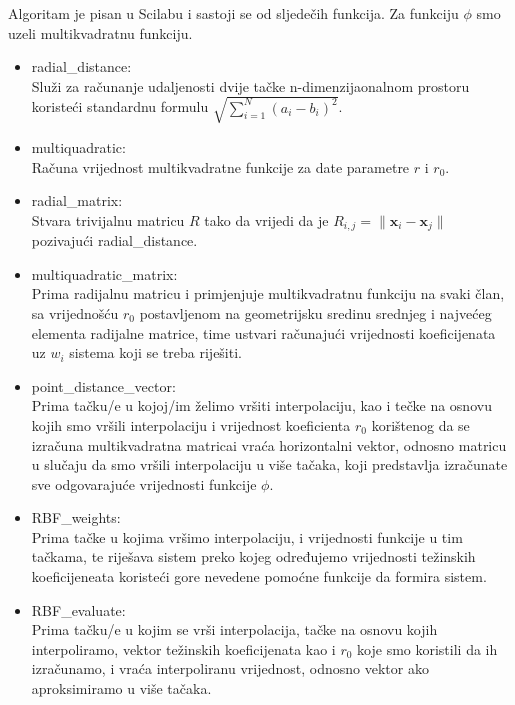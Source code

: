 \documentclass[12pt, a4paper]{report}
\theoremstyle{definition}
\begin{document}
	Algoritam je pisan u Scilabu i sastoji se od sljedečih funkcija. Za funkciju $\phi$ smo uzeli multikvadratnu funkciju.
	\begin{itemize}
		\item radial\_distance:\\
		Služi za računanje udaljenosti dvije tačke n-dimenzijaonalnom prostoru koristeći standardnu formulu $\sqrt{\sum_{i=1}^N(a_i-b_i)^2}$.
		
		\item multiquadratic:\\
		Računa vrijednost multikvadratne funkcije za date parametre $r$ i $r_0$.
		
		\item radial\_matrix:\\
		Stvara trivijalnu matricu $R$ tako da vrijedi da je 
		$R_{i,j}= \| \textbf{x}_i - \textbf{x}_j \|$ pozivajući radial\_distance.
		
		\item multiquadratic\_matrix:\\
		Prima radijalnu matricu i primjenjuje multikvadratnu funkciju na svaki član, sa vrijednošću $r_0$ postavljenom na geometrijsku sredinu srednjeg i najvećeg elementa radijalne matrice, time ustvari računajući vrijednosti koeficijenata uz $w_i$ sistema koji se treba riješiti.
		
		\item point\_distance\_vector:\\
		Prima tačku/e u kojoj/im želimo vršiti interpolaciju, kao i tečke na osnovu kojih smo vršili interpolaciju i vrijednost koeficienta $r_0$ korištenog da se izračuna multikvadratna matricai vraća horizontalni vektor, odnosno matricu u slučaju da smo vršili interpolaciju u više tačaka, koji predstavlja izračunate sve odgovarajuće vrijednosti funkcije $\phi$.
		
		\item RBF\_weights:\\
		Prima tačke u kojima vršimo interpolaciju, i vrijednosti funkcije u tim tačkama, te riješava sistem preko kojeg određujemo vrijednosti težinskih koeficijeneata koristeći gore nevedene pomoćne funkcije da formira sistem.
		
		\item RBF\_evaluate:\\
		Prima tačku/e u kojim se vrši interpolacija, tačke na osnovu kojih interpoliramo, vektor težinskih koeficijenata kao i $r_0$ koje smo koristili da ih izračunamo, i vraća interpoliranu vrijednost, odnosno vektor ako aproksimiramo u više tačaka.
		

\end{itemize}
\end{document}
